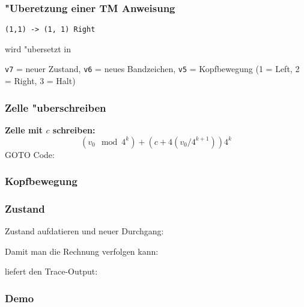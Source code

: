 \documentclass{beamer}
\begin{document}
\begin{frame}
\frametitle{"Uberetzung einer TM Anweisung}
\begin{center}
\tt (1,1) -> (1, 1) Right
\end{center}
wird "ubersetzt in

{\tt v7} = neuer Zustand, {\tt v6} = neues Bandzeichen, {\tt v5} = Kopfbewegung
(1 = Left, 2 = Right, 3 = Halt)
\end{frame}

\begin{frame}
\frametitle{Zelle "uberschreiben}
{\bf Zelle mit $c$ schreiben:}
\[
(v_0\mod 4^k)
+ (c +
4(v_0/4^{k+1})
)4^k
\]
GOTO Code:
{\small

}
\end{frame}

\begin{frame}
\frametitle{Kopfbewegung}

\end{frame}

\begin{frame}
\frametitle{Zustand}
Zustand aufdatieren und neuer Durchgang:

Damit man die Rechnung verfolgen kann:

liefert den Trace-Output:

\end{frame}

\begin{frame}
\frametitle{Demo}
\end{frame}
\end{document}
